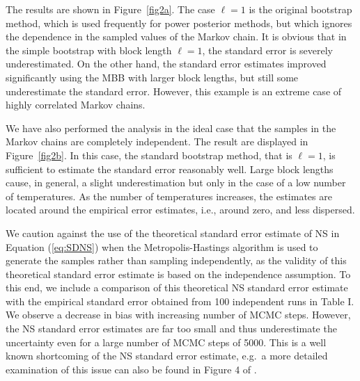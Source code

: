 \documentclass[aps,reprint,amsmath,amssymb,showpacs,showkeys]{revtex4-1}%
\newcommand{\cb}{ \color{blue}}
\begin{document}
The results are shown in Figure~\ref{fig2a}.  The case $\ell = 1$ is the original bootstrap method, which is used frequently for power posterior methods, but which ignores the dependence in the sampled values of the Markov chain.  It is obvious that in the simple bootstrap with block length $\ell=1$, the standard error is severely underestimated. On the other hand, the standard error estimates  improved significantly using 
the MBB with larger block lengths, but still some underestimate  the standard error.  However, this example is an extreme case of highly correlated Markov chains.  

We have also performed the analysis in the ideal case that the samples in the Markov chains are completely independent.  The result are displayed in Figure~\ref{fig2b}.  In this case, the standard bootstrap method, that is $\ell = 1$, is sufficient to estimate the standard error reasonably well. Large block lengths cause, in general, a slight underestimation but only in the case of a low number of temperatures.  As the number of temperatures increases, the estimates are located around the empirical error estimates, i.e., around zero, and less dispersed.


We caution against the use of the theoretical standard error estimate of NS in Equation (\ref{eq:SDNS}) when the Metropolis-Hastings algorithm is used to generate the samples rather
than sampling independently, as the validity of this theoretical standard error estimate is based on the independence assumption. To this end, we include a comparison of
this theoretical NS standard error estimate with the empirical standard error obtained from 100 independent runs in Table I.
We observe a decrease in bias with increasing number of MCMC steps. However,  the NS standard error estimates are far too small and thus underestimate the uncertainty
even for a large number of MCMC steps of 5000. This is a well known shortcoming of the NS standard error estimate, e.g.\ a more detailed examination of this issue can also be found in Figure 4 of  \cite{Veitch:2010}.
\end{document}
